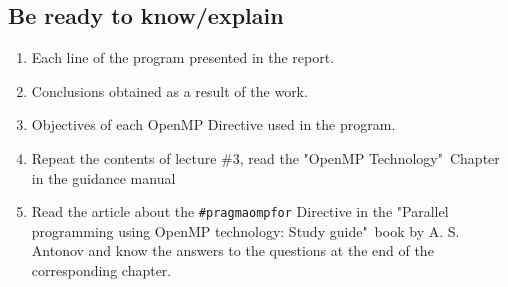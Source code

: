 { %
	\subsection{Be ready to know/explain}
	\begin{enumerate}
		\item Each line of the program presented in the report.
		\item Conclusions obtained as a result of the work.
		\item Objectives of each OpenMP Directive used in the program.
		\item Repeat the contents of lecture \#3, read the "OpenMP Technology"\ Chapter in the guidance manual
		\item Read the article about the \texttt{\#pragma\textunderscore omp\textunderscore for} Directive in the "Parallel programming using OpenMP technology: Study guide"\ book by A. S. Antonov and know the answers to the questions at the end of the corresponding chapter.
	\end{enumerate}
}